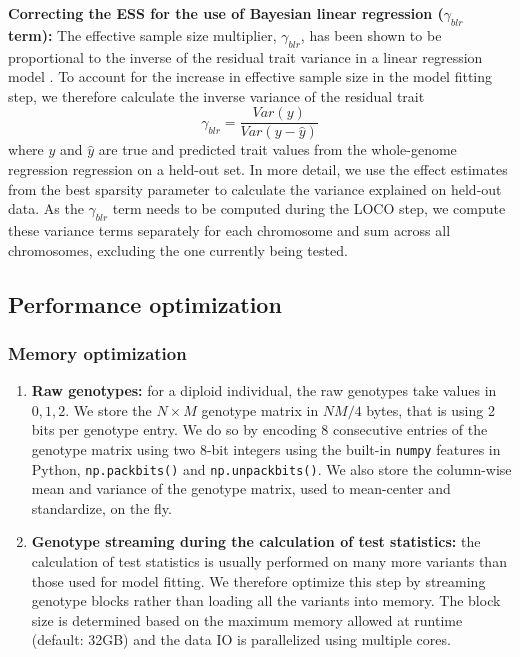 %
\noindent \textbf{Correcting the ESS for the use of Bayesian linear regression ($\gamma_{blr}$ term):}
%
The effective sample size multiplier, $\gamma_{blr}$, has been shown to be proportional to the inverse of the residual trait variance in a linear regression model \cite{loh2015efficient, ziyatdinov2021estimating}.
%
To account for the increase in effective sample size in the model fitting step, we therefore calculate the inverse variance of the residual trait 
\begin{equation}
    \gamma_{blr} = \frac{Var(y)}{Var(y-\hat{y})}
\end{equation}
where $y$ and $\hat{y}$ are true and predicted trait values from the whole-genome regression regression on a held-out set.
%
In more detail, we use the effect estimates from the best sparsity parameter to calculate the variance explained on held-out data.
%
As the $\gamma_{blr}$ term needs to be computed during the LOCO step, we compute these variance terms separately for each chromosome and sum across all chromosomes, excluding the one currently being tested.
%


\subsection{Performance optimization}
\subsubsection{Memory optimization}
\begin{enumerate}
    \item \textbf{Raw genotypes:}
    for a diploid individual, the raw genotypes take values in ${0,1,2}$.
    We store the $N \times M$ genotype matrix in $NM/4$ bytes, that is using 2 bits per genotype entry.
    We do so by encoding 8 consecutive entries of the genotype matrix using two 8-bit integers using the built-in \texttt{numpy} features in Python, \texttt{np.packbits()} and \texttt{np.unpackbits()}.
    We also store the column-wise mean and variance of the genotype matrix, used to mean-center and standardize, on the fly.
    
    \item \textbf{Genotype streaming during the calculation of test statistics:}
    the calculation of test statistics is usually performed on many more variants than those used for model fitting.
    We therefore optimize this step by streaming genotype blocks rather than loading all the variants into memory.
    The block size is determined based on the maximum memory allowed at runtime (default: 32GB) and the data IO is parallelized using multiple cores.
    
\end{enumerate}

